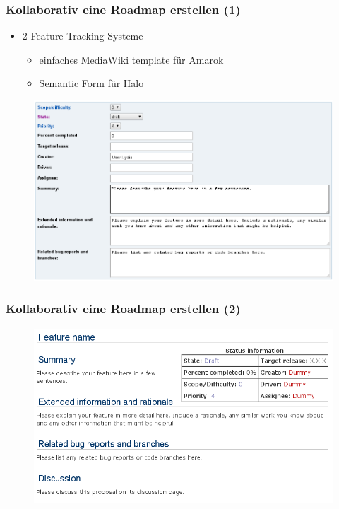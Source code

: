 \documentclass{beamer}
\begin{document}
\begin{frame}
\frametitle{Kollaborativ eine Roadmap erstellen (1)}
\begin{itemize}
 \item 2 Feature Tracking Systeme
 \begin{itemize}
   \item einfaches MediaWiki template f\"ur Amarok
   \item Semantic Form f\"ur Halo
 \end{itemize}
\end{itemize}
\begin{figure}
 \includegraphics[scale=0.25,keepaspectratio=true]{./featuretrackingform.png}
\end{figure}
\end{frame}

\begin{frame}
\frametitle{Kollaborativ eine Roadmap erstellen (2)}
\begin{figure}
 \includegraphics[scale=0.45,keepaspectratio=true]{./FeatureProposalTemplateAmarok.png}
\end{figure}
\end{frame}
\end{document}
